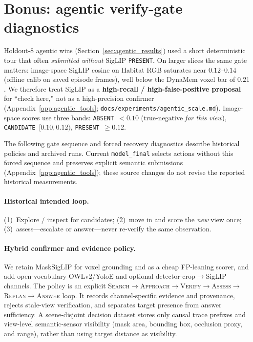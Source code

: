 \section{Bonus: agentic verify-gate diagnostics}
\label{app:agentic_verify_gate}

Holdout-8 agentic wins (Section~\ref{sec:agentic_results}) used a short deterministic tour that often \emph{submitted without} SigLIP \texttt{PRESENT}.
On larger slices the same gate matters: image-space SigLIP cosine on Habitat RGB saturates near $0.12$--$0.14$ (offline calib on saved episode frames), well below the DynaMem voxel bar of $0.21$.
We therefore treat SigLIP as a \textbf{high-recall / high-false-positive proposal} for ``check here,'' not as a high-precision confirmer (Appendix~\ref{app:agentic_tools}; \texttt{docs/experiments/agentic\_scale.md}).
Image-space scores use three bands: \texttt{ABSENT}~$< 0.10$ (true-negative \emph{for this view}), \texttt{CANDIDATE}~$[0.10, 0.12)$, \texttt{PRESENT}~$\geq 0.12$.

The following gate sequence and forced recovery diagnostics describe historical
policies and archived runs. Current \texttt{model\_final} selects actions without
this forced sequence and preserves explicit semantic submissions
(Appendix~\ref{app:agentic_tools}); these source changes do not revise the
reported historical measurements.

\paragraph{Historical intended loop.}
(1)~Explore / inspect for candidates;
(2)~move in and score the \emph{new} view once;
(3)~assess---escalate or answer---never re-verify the same observation.

\paragraph{Hybrid confirmer and evidence policy.}
We retain MaskSigLIP for voxel grounding and as a cheap FP-leaning scorer, and add open-vocabulary OWLv2/YoloE and optional detector-crop$\rightarrow$SigLIP channels.
The policy is an explicit \textsc{Search}$\rightarrow$\textsc{Approach}$\rightarrow$\textsc{Verify}$\rightarrow$\textsc{Assess}$\rightarrow$\textsc{Replan}$\rightarrow$\textsc{Answer} loop.
It records channel-specific evidence and provenance, rejects stale-view verification, and separates target presence from answer sufficiency.
A scene-disjoint decision dataset stores only causal trace prefixes and view-level semantic-sensor visibility (mask area, bounding box, occlusion proxy, and range), rather than using target distance as visibility.

